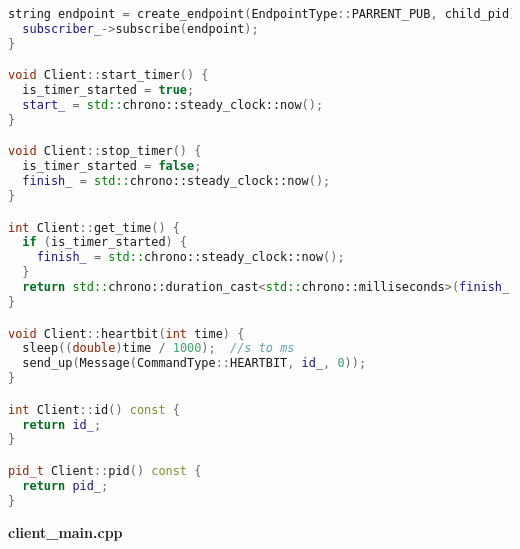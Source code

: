 \begin{lstlisting}[language=C++]
  string endpoint = create_endpoint(EndpointType::PARRENT_PUB, child_pid);
  subscriber_->subscribe(endpoint);
}

void Client::start_timer() {
  is_timer_started = true;
  start_ = std::chrono::steady_clock::now();
}

void Client::stop_timer() {
  is_timer_started = false;
  finish_ = std::chrono::steady_clock::now();
}

int Client::get_time() {
  if (is_timer_started) {
    finish_ = std::chrono::steady_clock::now();
  }
  return std::chrono::duration_cast<std::chrono::milliseconds>(finish_ - start_).count();
}

void Client::heartbit(int time) {
  sleep((double)time / 1000);  //s to ms
  send_up(Message(CommandType::HEARTBIT, id_, 0));
}

int Client::id() const {
  return id_;
}

pid_t Client::pid() const {
  return pid_;
}

\end{lstlisting}

\textbf{client\_main.cpp}

